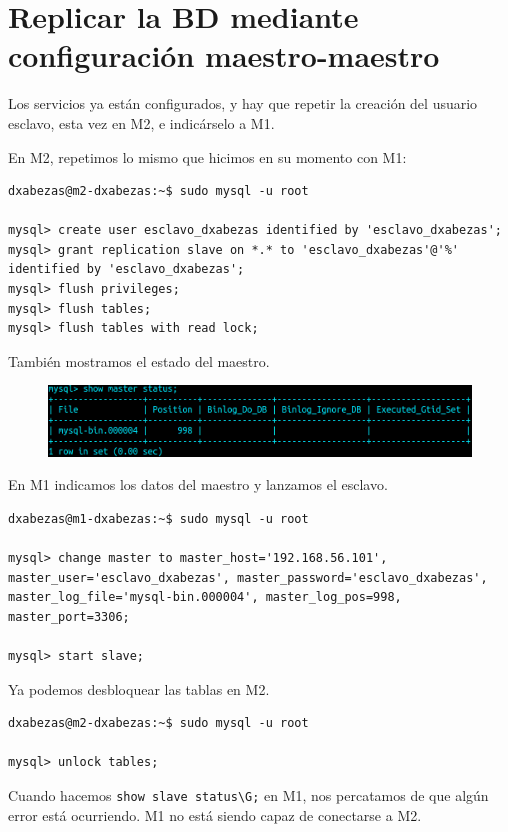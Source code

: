 \documentclass{article}
\begin{document}
\section{Replicar la BD mediante configuración maestro-maestro}

Los servicios ya están configurados, y hay que repetir la creación del usuario esclavo, esta vez en M2, e indicárselo a M1.

En M2, repetimos lo mismo que hicimos en su momento con M1:
\begin{Verbatim}
dxabezas@m2-dxabezas:~$ sudo mysql -u root

mysql> create user esclavo_dxabezas identified by 'esclavo_dxabezas';
mysql> grant replication slave on *.* to 'esclavo_dxabezas'@'%' identified by 'esclavo_dxabezas';
mysql> flush privileges;
mysql> flush tables;
mysql> flush tables with read lock;
\end{Verbatim}
También mostramos el estado del maestro.
\begin{figure}[H]
	\centering
	\includegraphics[width=150mm]{imgs/m2-master-status}
\end{figure}

En M1 indicamos los datos del maestro y lanzamos el esclavo.

\begin{Verbatim}[tabsize=7]
dxabezas@m1-dxabezas:~$ sudo mysql -u root

mysql> change master to master_host='192.168.56.101',
master_user='esclavo_dxabezas', master_password='esclavo_dxabezas',
master_log_file='mysql-bin.000004', master_log_pos=998, master_port=3306;

mysql> start slave;
\end{Verbatim}

Ya podemos desbloquear las tablas en M2.
\begin{Verbatim}
dxabezas@m2-dxabezas:~$ sudo mysql -u root

mysql> unlock tables;
\end{Verbatim}

Cuando hacemos \verb|show slave status\G;| en M1, nos percatamos de que algún error está ocurriendo. M1 no está
siendo capaz de conectarse a M2.
\begin{figure}[H]
	\centering
\end{figure}
\end{document}
